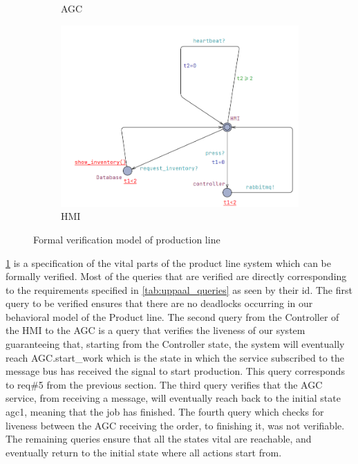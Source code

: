 \begin{figure}[ht]
\begin{subfigure}[b]{0.5\linewidth}
    \caption{AGC}
  \end{subfigure}
  \begin{subfigure}[b]{0.7\linewidth}
    \includegraphics[width=\linewidth]{images/HMI.png}
    \caption{HMI}
  \end{subfigure}
  \caption{Formal verification model of production line}
  \label{fig:Productline}
\end{figure}




\ref{fig:Productline} is a specification of the vital parts of the product line system which can be formally verified. Most of the queries that are verified are directly corresponding to the requirements specified in \ref{tab:uppaal_queries} as seen by their id. The first query to be verified ensures that there are no deadlocks occurring in our behavioral model of the Product line. The second query from the Controller of the HMI to the AGC is a query that verifies the liveness of our system guaranteeing that, starting from the Controller state, the system will eventually reach AGC.start\_work which is the state in which the service subscribed to the message bus has received the signal to start production. This query corresponds to req\#5 from the previous section. The third query verifies that the AGC service, from receiving a message, will eventually reach back to the initial state agc1, meaning that the job has finished. The fourth query which checks for liveness between the AGC receiving the order, to finishing it, was not verifiable. The remaining queries ensure that all the states vital are reachable, and eventually return to the initial state where all actions start from. 


